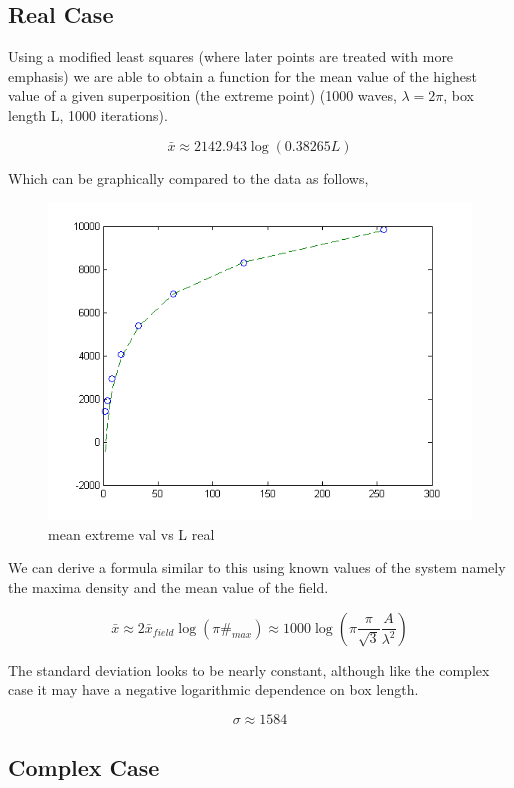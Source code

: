 \documentclass[12pt]{article}
\begin{document}
\subsection{Real Case}

Using a modified least squares (where later points are treated with more emphasis) we are able to obtain a function for the mean value of the highest value of a given superposition (the extreme point) (1000 waves, $\lambda = 2\pi$, box length L, 1000 iterations).

\[\bar{x} \approx 2142.943 \log(0.38265 L)\]

Which can be graphically compared to the data as follows,

\begin{figure}[ht]
	\centering
		\includegraphics[width=1.00\textwidth]{avgExVsAreal.png}
	\caption{mean extreme val vs L real}
	\label{fig:avgExVsAreal}
\end{figure}

We can derive a formula similar to this using known values of the system namely the maxima density and the mean value of the field.

\[\bar{x} \approx 2 \bar{x}_{field} \log(\pi \#_{max}) \approx 1000 \log(\pi \frac{\pi}{\sqrt{3}} \frac{A}{\lambda^{2}})\]

The standard deviation looks to be nearly constant, although like the complex case it may have a negative logarithmic dependence on box length.

\[\sigma \approx 1584\]

\subsection{Complex Case}
\end{document}
